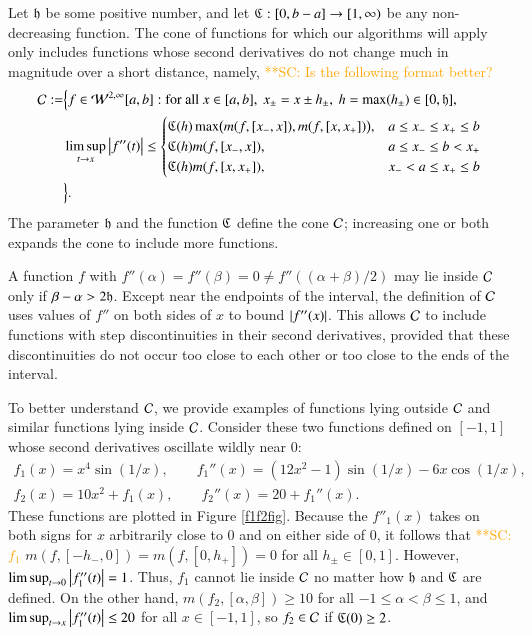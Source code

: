 \documentclass[review]{elsarticle}
\makeatletter
\newcommand{\Vast}{\bBigg@{6}}
\theoremstyle{definition}
\newcommand{\Vastr}{\mathclose\Vast}
\newcommand{\scnote}[1]{ {\textcolor{orange}  {\mbox{**SC:} #1}}}
\makeatother
\begin{document}
Let $\mathfrak{h}$ be some positive number, and let $\mathfrak{C} : [0,b-a] \to [1,\infty)$ be any
non-decreasing function. The cone of functions for which our algorithms will
apply only includes functions whose second derivatives do not change much in
magnitude over a short distance, namely, \scnote{Is the following format better?}
\begin{align} \label{conedef}
\nonumber \cc :=  & \Bigl \{ 
 f  \in    \cw^{2,\infty}[a,b]:    \text{for all } x \in [a,b], \ x_\pm = x \pm h_\pm, \ h = \max(h_{\pm}) \in [0, \fh], 
\\ \nonumber  & \limsup_{t \to x}\abs{f''(t)}  \le  
\begin{cases} 
  \fC(h) \max\bigl(m(f,[x_-,x]),m(f,[x,x_+])\bigr), & a \le x_- \le x_+ \le b\\
\fC(h) m(f,[x_-,x]), & a \le x_- \le b <  x_+\\
\fC(h) m(f,[x,x_+]), & x_- < a \le x_+ \le b
\end{cases} %
\\ & \Bigr \}.
\end{align}
The parameter $\mathfrak{h}$ and the function $\mathfrak{C}$ define the cone $\mathcal{C}$; increasing
one or both expands the cone to include more functions.

A function $f$ with $f''(\alpha) = f''(\beta) = 0 \ne f''((\alpha+\beta)/2)$ may
lie inside $\mathcal{C}$ only if $\beta - \alpha > 2\mathfrak{h}$. Except near the endpoints of
the interval, the definition of $\mathcal{C}$ uses values of $f''$ on both sides of $x$
to bound $\left \lvert f''(x) \right \rvert$. This allows $\mathcal{C}$ to include functions with step
discontinuities in their second derivatives, provided that these discontinuities
do not occur too close to each other or too close to the ends of the interval.

To better understand $\mathcal{C}$, we provide examples of functions lying outside $\mathcal{C}$
and similar functions lying inside $\mathcal{C}$. Consider these two functions defined
on $[-1,1]$ whose second derivatives oscillate wildly near $0$:
\begin{gather*}
f_1(x) = x^4 \sin(1/x), \qquad f_1''(x) = (12x^2 - 1) \sin(1/x) -6 x \cos(1/x), \\
f_2(x) = 10  x^2 + f_1(x), \qquad f_2''(x) = 20+ f_1''(x).
\end{gather*}
These functions are plotted in Figure \ref{f1f2fig}. Because the $f''_1(x)$
takes on both signs for $x$ arbitrarily close to $0$ and on either side of $0$,
it follows that \scnote{$f_1$}  $m(f,[-h_-,0]) = m(f,[0,h_+]) = 0$ for all $h_\pm \in [0,1]$.
However, $\limsup_{t \to 0} \left \lvert f''_1(t) \right \rvert = 1$. Thus, $f_1$ cannot lie inside
$\mathcal{C}$ no matter how $\mathfrak{h}$ and $\mathfrak{C}$ are defined. On the other hand,
$m(f_2,[\alpha, \beta]) \ge 10$ for all $-1 \le \alpha < \beta \le 1$, and
$\limsup_{t \to x} \left \lvert f''_1(t) \right \rvert \le 20$ for all $x \in [-1,1]$, so $f_2 \in
\mathcal{C}$ if $\mathfrak{C}(0) \ge 2$.
\end{document}
